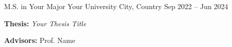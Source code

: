 

\begin{cventries}

  \cventry
    {M.S. in Your Major}
    {Your University}
    {City, Country}
    {Sep 2022 -- Jun 2024}
    {
      \begin{cvitems}
        \item {\textbf{Thesis:} \textit{Your Thesis Title}}
        \item {\textbf{Advisors:} Prof. Name}
      \end{cvitems}
    }

\end{cventries}
